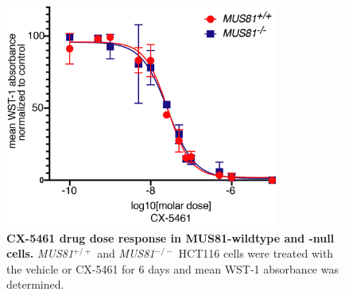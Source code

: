 \begin{figure}
    \centering
    \includegraphics[width=0.8\textwidth]{supplement/figures/Mus81_cells.png}
    \caption[CX-5461 drug dose response in HCT116 MUS81-wildtype and -null cells]
            {\small{\textbf{CX-5461 drug dose response in MUS81-wildtype and -null cells.}}
            \textit{MUS81$^{+/+}$} and \textit{MUS81$^{-/-}$} HCT116 cells were treated with the vehicle or CX-5461 for 6 days and mean WST-1 absorbance was determined. 
            }
        \label{sfig:mus81cells}
\end{figure}

